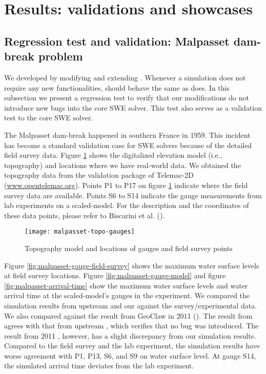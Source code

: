 \section{Results: validations and showcases}

\subsection{Regression test and validation: Malpasset dam-break problem}

We developed \geoclawlandspill{} by modifying and extending \geoclaw{}.
Whenever a simulation does not require any new functionalities, \geoclawlandspill{} should behave the same as \geoclaw{} does.
In this subsection we present a regression test to verify that our modifications do not introduce new bugs into the core SWE solver.
This test also serves as a validation test to the core SWE solver.

The Malpasset dam-break happened in southern France in 1959.
This incident has become a standard validation case for SWE solvers because of the detailed field survey data.
Figure \ref{fig:malpasset-topo-gauges} shows the digitalized elevation model (i.e., topography) and locations where we have real-world data.
We obtained the topography data from the validation package of Telemac-2D (\url{www.opentelemac.org}).
Points P1 to P17 on figure \ref{fig:malpasset-topo-gauges} indicate where the field survey data are available.
Points S6 to S14 indicate the gauge measurements from lab experiments on a scaled-model.
For the description and the coordinates of these data points, please refer to Biscarini et al. (\cite{biscarini_simulation_2016}).

\begin{figure}
    \centering
    \texttt{[image: malpasset-topo-gauges]}
    \caption{Topography model and locations of gauges and field survey points}\label{fig:malpasset-topo-gauges}
\end{figure}

Figure \ref{fig:malpasset-gauge-field-survey} shows the maximum water surface levels at field survey locations.
Figure \ref{fig:malpasset-gauge-model} and figure \ref{fig:malpasset-arrival-time} show the maximum water surface levels and water arrival time at the scaled-model's gauges in the experiment.
We compared the simulation results from upstream \geoclaw{} and our \geoclawlandspill{} against the survey/experimental data.
We also compared against the result from GeoClaw in 2011 (\cite{George2011}).
The result from \geoclawlandspill{} agrees with that from upstream \geoclaw{}, which verifies that no bug was introduced.
The result from 2011 \geoclaw{}, however, has a slight discrepancy from our simulation results.
Compared to the field survey and the lab experiment, the simulation results have worse agreement with P1, P13, S6, and S9 on water surface level.
At gauge S14, the simulated arrival time deviates from the lab experiment.


